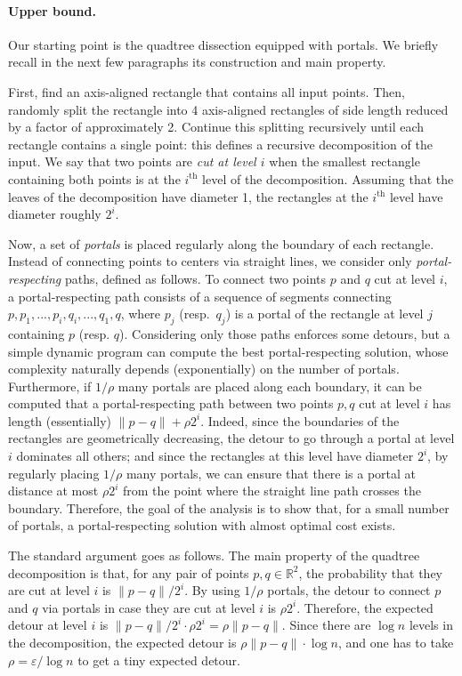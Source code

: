 \documentclass[11pt]{article}
\newcommand{\R}{\mathbb R}
\newcommand{\eps}{\varepsilon}
\begin{document}
\paragraph*{Upper bound.} Our starting point is the quadtree dissection equipped with portals. We briefly recall in the next few  paragraphs its construction and main property. 

First, find an axis-aligned rectangle that contains all input points. Then, randomly split the rectangle into 4 axis-aligned rectangles of side length reduced by a factor of approximately 2. Continue this splitting recursively until each rectangle contains a single point: this defines a recursive decomposition of the input. 
We say that two points are \textit{cut at level $i$} when the smallest rectangle containing both points is at the $i^{\text{th}}$ level of the decomposition. Assuming that the leaves of the decomposition have diameter 1, the rectangles at the $i^{\text{th}}$ level have diameter roughly $2^i$.

Now, a set of \emph{portals} is placed regularly along the boundary of each rectangle. 
Instead of connecting points to centers via straight lines, we consider only \emph{portal-respecting} paths, defined as follows. To connect two points $p$ and $q$ cut at level $i$, a portal-respecting path consists of a sequence of segments connecting $p, p_1, ..., p_i, q_i, ..., q_1, q$, where $p_j$ (resp.\ $q_j$) is a portal of the rectangle at level $j$ containing $p$ (resp. $q$). 
Considering only those paths enforces some detours, but a simple dynamic program can compute the best portal-respecting solution, whose complexity naturally depends (exponentially) on the number of portals. 
Furthermore, if $1/\rho$ many portals are placed along each boundary, it can be computed that a portal-respecting path between two points $p, q$ cut at level $i$ has length (essentially) $\|p-q\| + \rho 2^i$. Indeed, since the boundaries of the rectangles are  geometrically decreasing, the detour to go through a portal at level $i$ dominates all others; and since the rectangles at this level have diameter $2^i$, by regularly placing    $1/\rho$ many portals, we can ensure that there is a portal at distance at most $\rho 2^i$ from the point where the straight line path crosses the boundary.
Therefore, the goal of the analysis is to show that, for a small number of portals, a portal-respecting solution with almost optimal cost exists. 

The standard argument goes as follows. The main property of the quadtree decomposition is that, for any pair of points $p, q \in \R^2$, the probability that they are cut at level $i$ is $\|p-q\| / 2^i$. By using $1/\rho$ portals, the detour to connect $p$ and $q$ via portals in case they are cut at level $i$ is $\rho 2^i$.
Therefore, the expected detour at level $i$ is $\|p-q\| / 2^i \cdot \rho 2^i = \rho \|p-q\|$. Since there are $\log n$ levels in the decomposition, the expected detour is $\rho \|p-q\| \cdot \log n$, and one has to take $\rho = \eps / \log n$ to get a tiny expected detour.
\end{document}
